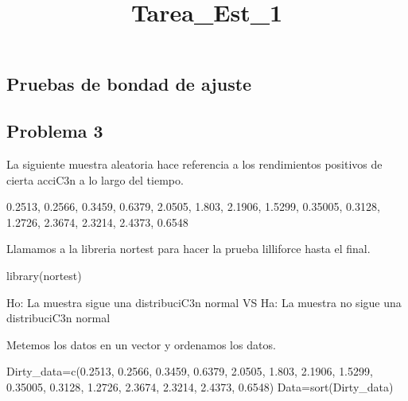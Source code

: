 \documentclass[
]{article}
\title{Tarea\_Est\_1}
\author{}
\date{\vspace{-2.5em}}
\newenvironment{Shaded}{\begin{snugshade}}{\end{snugshade}}
\newcommand{\FloatTok}[1]{\textcolor[rgb]{0.00,0.00,0.81}{#1}}
\newcommand{\FunctionTok}[1]{\textcolor[rgb]{0.00,0.00,0.00}{#1}}
\newcommand{\NormalTok}[1]{#1}
\newcommand{\OtherTok}[1]{\textcolor[rgb]{0.56,0.35,0.01}{#1}}
\begin{document}
\maketitle

\hypertarget{pruebas-de-bondad-de-ajuste}{%
\subsection{Pruebas de bondad de
ajuste}\label{pruebas-de-bondad-de-ajuste}}

\hypertarget{problema-3}{%
\subsection{Problema 3}\label{problema-3}}

La siguiente muestra aleatoria hace referencia a los rendimientos
positivos de cierta acciC3n a lo largo del tiempo.

0.2513, 0.2566, 0.3459, 0.6379, 2.0505, 1.803, 2.1906, 1.5299, 0.35005,
0.3128, 1.2726, 2.3674, 2.3214, 2.4373, 0.6548

Llamamos a la libreria nortest para hacer la prueba lilliforce hasta el
final.

\begin{Shaded}
\begin{Highlighting}[]
\FunctionTok{library}\NormalTok{(nortest)}
\end{Highlighting}
\end{Shaded}

Ho: La muestra sigue una distribuciC3n normal VS Ha: La muestra no sigue
una distribuciC3n normal

Metemos los datos en un vector y ordenamos los datos.

\begin{Shaded}
\begin{Highlighting}[]
\NormalTok{Dirty\_data}\OtherTok{=}\FunctionTok{c}\NormalTok{(}\FloatTok{0.2513}\NormalTok{, }\FloatTok{0.2566}\NormalTok{, }\FloatTok{0.3459}\NormalTok{, }\FloatTok{0.6379}\NormalTok{, }\FloatTok{2.0505}\NormalTok{, }\FloatTok{1.803}\NormalTok{, }\FloatTok{2.1906}\NormalTok{,}
             \FloatTok{1.5299}\NormalTok{, }\FloatTok{0.35005}\NormalTok{, }\FloatTok{0.3128}\NormalTok{, }\FloatTok{1.2726}\NormalTok{, }\FloatTok{2.3674}\NormalTok{, }\FloatTok{2.3214}\NormalTok{, }\FloatTok{2.4373}\NormalTok{, }\FloatTok{0.6548}\NormalTok{)}
\NormalTok{Data}\OtherTok{=}\FunctionTok{sort}\NormalTok{(Dirty\_data)}
\end{Highlighting}
\end{Shaded}
\end{document}
